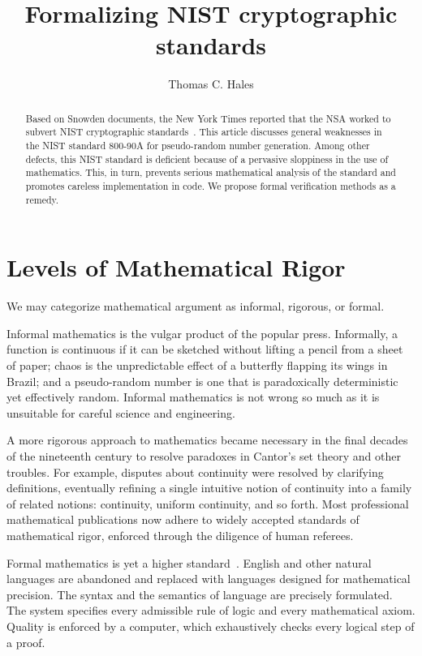 \documentclass[11pt]{amsart} %
\begin{document}
\title{Formalizing NIST cryptographic standards}
\author{Thomas C. Hales} 
\maketitle


\begin{abstract} Based on Snowden documents, the New York Times reported that 
the NSA worked to subvert NIST cryptographic standards~\cite{NYT-backdoor}.  
This article discusses general weaknesses in the NIST standard 800-90A for pseudo-random number
generation.
Among other defects, this NIST standard is deficient because of a pervasive sloppiness in the use of
mathematics.
This, in turn, prevents serious mathematical analysis of the standard and promotes careless implementation in code.
We propose formal verification methods as a remedy.
\end{abstract}

\section{Levels of Mathematical Rigor}

We may categorize mathematical argument as 
 informal,  rigorous, or formal.


Informal mathematics is the vulgar product of the popular press.
Informally, a function is continuous if it can be sketched without lifting a pencil from a sheet of paper;
chaos is the unpredictable
effect of a butterfly flapping its wings in Brazil; and 
a pseudo-random number is one that is paradoxically deterministic yet effectively random.
Informal mathematics is not wrong so much as it is unsuitable for careful science
and engineering.

 A more rigorous approach
to mathematics became necessary in the final decades of the nineteenth century  
to resolve 
paradoxes in Cantor's set theory and other troubles.
For example, disputes about continuity were resolved by clarifying definitions,
eventually refining a single intuitive notion of continuity into a family of related notions: 
continuity, uniform continuity, 
and so forth.  Most professional mathematical publications now adhere to widely accepted 
standards of mathematical
rigor,  enforced through the  diligence of human referees.

Formal mathematics is yet a higher standard~\cite{Hales:2008:formal}.   English and other natural languages are abandoned and 
replaced with languages designed for mathematical
precision. The syntax and the semantics of language are precisely formulated.
The system specifies
every admissible rule of logic and  every mathematical axiom.  
Quality is enforced by a computer, which exhaustively checks every logical step of a proof.
\end{document}
